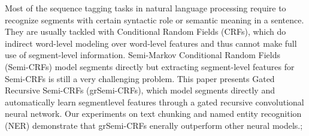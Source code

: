 Most of the sequence tagging tasks in natural language processing require to recognize segments with certain syntactic role or semantic meaning in a sentence. They are usually tackled with Conditional Random Fields (CRFs), which do indirect word-level modeling over word-level features and thus cannot make full use of segment-level information. Semi-Markov Conditional Random Fields (Semi-CRFs) model segments directly but extracting segment-level features for Semi-CRFs is still a very challenging problem. This paper presents Gated Recursive Semi-CRFs (grSemi-CRFs), which model segments directly and automatically learn segmentlevel features through a gated recursive convolutional neural network. Our experiments on text chunking and named entity recognition (NER) demonstrate that grSemi-CRFs  enerally outperform other neural models.;

